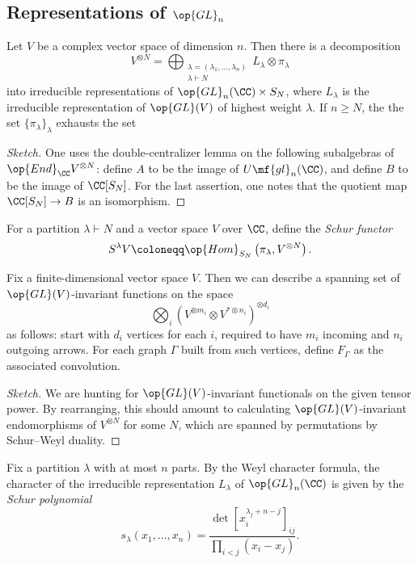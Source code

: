 \documentclass{article}
\begin{document}
\subsection{Representations of \texorpdfstring{$\op{GL}_n$}{GLn}}
\begin{theorem}
	Let $V$ be a complex vector space of dimension $n$. Then there is a decomposition
	\[V^{\otimes N}=\bigoplus_{\substack{\lambda=(\lambda_1,\ldots,\lambda_n)\\\lambda\vdash N}}L_\lambda\otimes\pi_\lambda\]
	into irreducible representations of $\op{GL}_n(\CC)\times S_N$, where $L_\lambda$ is the irreducible representation of $\op{GL}(V)$ of highest weight $\lambda$. If $n\ge N$, the the set $\{\pi_\lambda\}_\lambda$ exhausts the set
\end{theorem}
\begin{proof}[Sketch]
	One uses the double-centralizer lemma on the following subalgebras of $\op{End}_\CC V^{\otimes N}$: define $A$ to be the image of $U\mf{gl}_n(\CC)$, and define $B$ to be the image of $\CC[S_N]$. For the last assertion, one notes that the quotient map $\CC[S_N]\to B$ is an isomorphism.
\end{proof}
\begin{definition}
	For a partition $\lambda\vdash N$ and a vector space $V$ over $\CC$, define the \textit{Schur functor}
	\[S^\lambda V\coloneqq\op{Hom}_{S_N}\left(\pi_\lambda,V^{\otimes N}\right).\]
\end{definition}
\begin{theorem}
	Fix a finite-dimensional vector space $V$. Then we can describe a spanning set of $\op{GL}(V)$-invariant functions on the space
	\[\bigotimes_i\left(V^{\otimes m_i}\otimes V^{*\otimes n_i}\right)^{\otimes d_i}\]
	as follows: start with $d_i$ vertices for each $i$, required to have $m_i$ incoming and $n_i$ outgoing arrows. For each graph $\Gamma$ built from such vertices, define $F_\Gamma$ as the associated convolution.\todo{}
\end{theorem}
\begin{proof}[Sketch]
	We are hunting for $\op{GL}(V)$-invariant functionals on the given tensor power. By rearranging, this should amount to calculating $\op{GL}(V)$-invariant endomorphisms of $V^{\otimes N}$ for some $N$, which are spanned by permutations by Schur--Weyl duality.
\end{proof}
\begin{definition}
	Fix a partition $\lambda$ with at most $n$ parts. By the Weyl character formula, the character of the irreducible representation $L_\lambda$ of $\op{GL}_n(\CC)$ is given by the \textit{Schur polynomial}
	\[s_\lambda(x_1,\ldots,x_n)=\frac{\det\left[x_i^{\lambda_j+n-j}\right]_{ij}}{\displaystyle\prod_{i<j}(x_i-x_j)}.\]
\end{definition}
\end{document}
